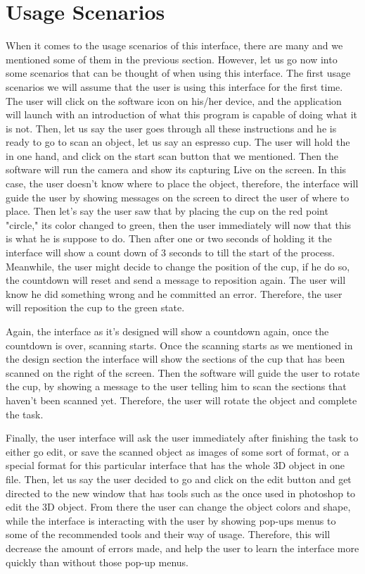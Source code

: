 \documentclass[12pt, oneside]{amsart}   	%
\begin{document}
 \section{Usage Scenarios}
When it comes to the usage scenarios of this interface, there are many and we mentioned some of them in the previous section.  However, let us go now into some scenarios that can be thought of when using this interface.  The first usage scenarios we will assume that the user is using this interface for the first time.  The user will click on the software icon on his/her device, and the application will launch with an introduction of what this program is capable of doing what it is not.  Then, let us say the user goes through all these instructions and he is ready to go to scan an object, let us say an espresso cup.  The user will hold the in one hand, and click on the start scan button that we mentioned.  Then the software will run the camera and show its capturing Live on the screen.  In this case, the user doesn't know where to place the object, therefore, the interface will guide the user by showing messages on the screen to direct the user of where to place. Then let's say the user saw that by placing the cup on the red point "circle," its color changed to green, then the user immediately will now that this is what he is suppose to do.  Then after one or two seconds of holding it the interface will show a count down of 3 seconds to till the start of the process. Meanwhile, the user might decide to change the position of the cup, if he do so, the countdown will reset and send a message to reposition again. The user will know he did something wrong and he committed an error. Therefore, the user will reposition the cup to the green state. 

Again, the interface as it's designed will show a countdown again, once the countdown is over, scanning starts.  Once the scanning starts as we mentioned in the design section the interface will show the sections of the cup that has been scanned on the right of the screen.  Then the software will guide the user to rotate the cup, by showing a message to the user telling him to scan the sections that haven't been scanned yet.  Therefore, the user will rotate the object and complete the task. 

Finally, the user interface will ask the user immediately after finishing the task to either go edit, or save the scanned object as images of some sort of format, or a special format for this particular interface that has the whole 3D object in one file. Then, let us say the user decided to go and click on the edit button and get directed to the new window that has tools such as the once used in photoshop to edit the 3D object.  From there the user can change the object colors and shape, while the interface is interacting with the user by showing pop-ups menus to some of the recommended tools and their way of usage.  Therefore, this will decrease the amount of errors made, and help the user to learn the interface more quickly than without those pop-up menus.  
\end{document}
